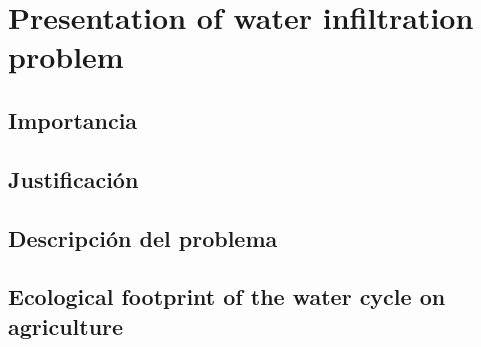 \section{Presentation of water infiltration problem}
\subsection{Importancia}
\subsection{Justificación}
\subsection{Descripción del problema}
\subsection{Ecological footprint of the water cycle on agriculture}

